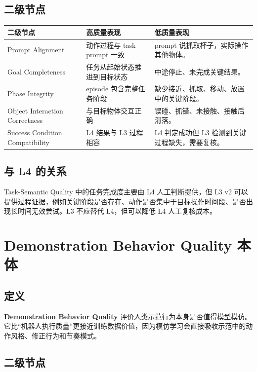 \documentclass[UTF8,zihao=-4]{ctexart}
\newcommand{\Term}[1]{\textbf{#1}}
\begin{document}
\subsection{二级节点}

\begin{longtable}{L{3.2cm} L{5.2cm} L{5.2cm}}
\toprule
二级节点 & 高质量表现 & 低质量表现 \\
\midrule
Prompt Alignment & 动作过程与 task prompt 一致 & prompt 说抓取杯子，实际操作其他物体。 \\
Goal Completeness & 任务从起始状态推进到目标状态 & 中途停止、未完成关键结果。 \\
Phase Integrity & episode 包含完整任务阶段 & 缺少接近、抓取、移动、放置中的关键阶段。 \\
Object Interaction Correctness & 与目标物体交互正确 & 误碰、抓错、未接触、接触后滑落。 \\
Success Condition Compatibility & L4 结果与 L3 过程相容 & L4 判定成功但 L3 检测到关键过程缺失，需要复核。 \\
\bottomrule
\end{longtable}

\subsection{与 L4 的关系}

Task-Semantic Quality 中的任务完成度主要由 L4 人工判断提供，但 L3 v2 可以提供过程证据，例如关键阶段是否存在、动作是否集中于目标操作时间段、是否出现长时间无效尝试。L3 不应替代 L4，但可以降低 L4 人工复核成本。

\section{Demonstration Behavior Quality 本体}

\subsection{定义}

\Term{Demonstration Behavior Quality} 评价人类示范行为本身是否值得模型模仿。它比“机器人执行质量”更接近训练数据价值，因为模仿学习会直接吸收示范中的动作风格、修正行为和节奏模式。

\subsection{二级节点}
\end{document}
